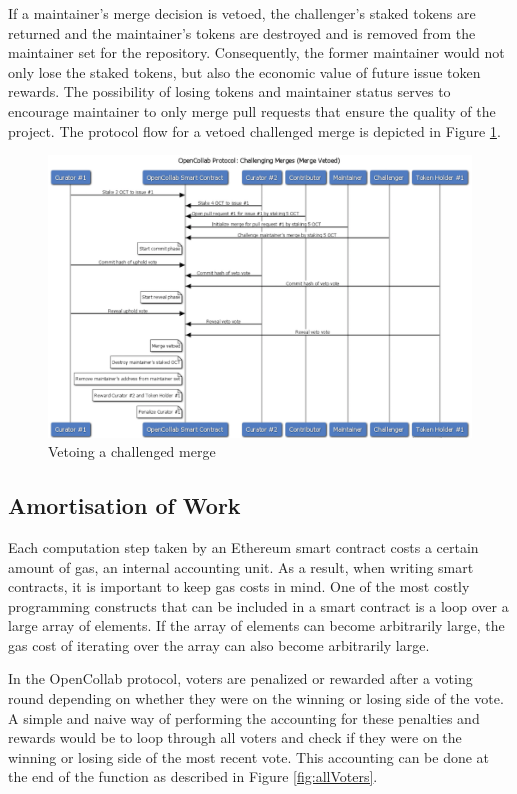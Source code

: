 If a maintainer's merge decision is vetoed, the challenger's staked tokens are
returned and the maintainer's  tokens are destroyed and is removed from the maintainer set for the
repository. Consequently, the former maintainer would not only lose the staked
tokens, but also the economic value of future issue token rewards. The
possibility of losing tokens and maintainer status serves to encourage
maintainer to only merge pull requests that ensure the quality of the project.
The protocol flow for a vetoed challenged merge is depicted in Figure \ref{fig:challengedVetoed}.

\begin{figure}[]
  \centering
  \includegraphics[width=\linewidth,keepaspectratio]{figures/OpenCollab-Protocol-Challenging-Merges-Veto.png}
  \caption{Vetoing a challenged merge}
  \label{fig:challengedVetoed}
\end{figure}

\subsection{Amortisation of Work}

Each computation step taken by an Ethereum smart contract costs a certain amount
of gas, an internal accounting unit. As a result, when writing smart contracts,
it is important to keep gas costs in mind. One of the most costly programming
constructs that can be included in a smart contract is a loop over a large array
of elements. If the array of elements can become arbitrarily large, the gas cost
of iterating over the array can also become arbitrarily large.

In the OpenCollab protocol, voters are penalized or rewarded after a voting
round depending on whether they were on the winning or losing side of the vote.
A simple and naive way of performing the accounting for these penalties and
rewards would be to loop through all voters and check if they were on the
winning or losing side of the most recent vote. This accounting can be done at
the end of the  function as described in Figure \ref{fig:allVoters}.


